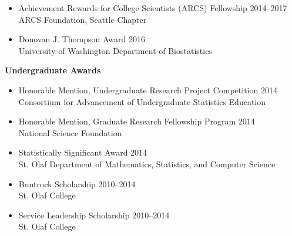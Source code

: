 \documentclass[margin]{res}
\newcommand{\annotateItem}[1]{
	\begin{itemize} \vspace{-0.1cm}
	\item[] 
	\begin{footnotesize}\textcolor{black}{(#1)}\end{footnotesize}
	\end{itemize} \vspace{-0.1cm}
}
\begin{document}
\begin{resume}
\begin{itemize}
\item Achievement Rewards for College Scientists (ARCS) Fellowship \hfill 2014--2017 \\
ARCS Foundation, Seattle Chapter

\item Donovan J. Thompson Award  \hfill 2016 \\
University of Washington Department of Biostatistics %

\end{itemize}


\textbf{Undergraduate Awards}
\begin{itemize}

\item Honorable Mention, Undergraduate Research Project Competition \hfill 2014  \\
Consortium for Advancement of Undergraduate Statistics Education

\item Honorable Mention, Graduate Research Fellowship Program  \hfill 2014 \\
National Science Foundation

\item Statistically Significant Award \hfill 2014 \\
St. Olaf Department of Mathematics, Statistics, and Computer Science 

\item Buntrock Scholarship \hfill 2010--2014 \\
St. Olaf College 

\item Service Leadership Scholarship \hfill 2010--2014 \\
St. Olaf College 


\end{itemize}
\end{resume}
\end{document}
